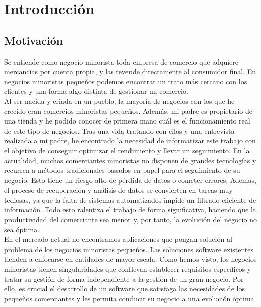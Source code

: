 \chapter{Introducción}
\label{chap:introduction}

\section{Motivación}
\label{sec:motivation}

Se entiende como negocio minorista toda empresa de comercio que adquiere mercancías por cuenta propia, y las revende directamente al consumidor final. En negocios minoristas pequeños podemos encontrar un trato más cercano con los clientes y una forma algo distinta de gestionar un comercio. \\

Al ser nacida y criada en un pueblo, la mayoría de negocios con los que he crecido eran comercios minoristas pequeños. Además, mi padre es propietario de una tienda y he podido conocer de primera mano cuál es el funcionamiento real de este tipo de negocios. Tras una vida tratando con ellos y una entrevista realizada a mi padre, he encontrado la necesidad de informatizar este trabajo con el objetivo de conseguir optimizar el rendimiento y llevar un seguimiento. En la actualidad, muchos comerciantes minoristas no disponen de grandes tecnologías y recurren a métodos tradicionales basados en papel para el seguimiento de su negocio. Esto tiene un riesgo alto de pérdida de datos o cometer errores. 
Además, el proceso de recuperación y análisis de datos se convierten en tareas muy tediosas, ya que la falta de sistemas automatizados impide un filtrado eficiente de información. Todo esto ralentiza el trabajo de forma significativa, haciendo que la productividad del comerciante sea menor y, por tanto, la evolución del negocio no sea óptima. \\

En el mercado actual no encontramos aplicaciones que pongan solución al problema de los negocios minoristas pequeños. Las soluciones software existentes tienden a enfocarse en entidades de mayor escala. Como hemos visto, los negocios minoristas tienen singularidades que conllevan establecer requisitos específicos y tratar su gestión de forma independiente a la gestión de un gran negocio. Por ello, es crucial el desarrollo de un software que satisfaga las necesidades de los pequeños comerciantes y les permita conducir su negocio a una evolución óptima. 


